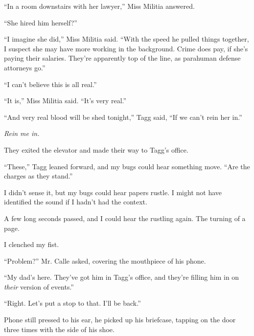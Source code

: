 ``In a room downstairs with her lawyer,'' Miss Militia answered.



``She hired him herself?''



``I imagine she did,'' Miss Militia said.  ``With the speed he pulled things together, I suspect she may have more working in the background.  Crime does pay, if she's paying their salaries.  They're apparently top of the line, as parahuman defense attorneys go.''



``I can't believe this is all real.''



``It is,'' Miss Militia said.  ``It's very real.''



``And very real blood will be shed tonight,'' Tagg said, ``If we can't rein her in.''



\emph{Rein me in.}



They exited the elevator and made their way to Tagg's office.



``These,'' Tagg leaned forward, and my bugs could hear something move.  ``Are the charges as they stand.''



I didn't sense it, but my bugs could hear papers rustle.  I might not have identified the sound if I hadn't had the context.



A few long seconds passed, and I could hear the rustling again.  The turning of a page.



I clenched my fist.



``Problem?''  Mr. Calle asked, covering the mouthpiece of his phone.



``My dad's here.  They've got him in Tagg's office, and they're filling him in on \emph{their} version of events.''



``Right.  Let's put a stop to that.  I'll be back.''



Phone still pressed to his ear, he picked up his briefcase, tapping on the door three times with the side of his shoe.



